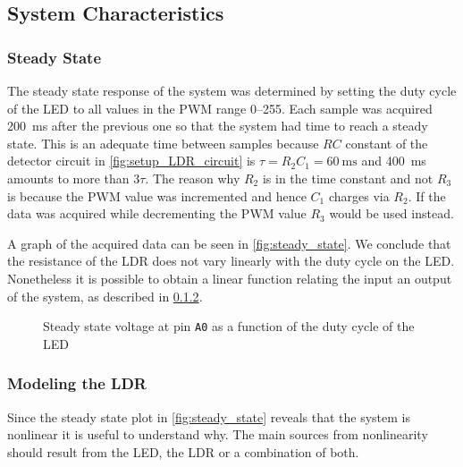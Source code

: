 \subsection{System Characteristics}
\label{sec:SystemCharacteristics}

\subsubsection{Steady State}
\label{sub:SteadyState}

The steady state response of the system was determined by setting the duty cycle of the LED to all values in the PWM range 0--255. Each sample was acquired \SI{200}{\milli\second} after the previous one so that the system had time to reach a steady state. This is an adequate time between samples because $RC$ constant of the detector circuit in \autoref{fig:setup_LDR_circuit} is $\tau = R_2C_1 = \SI{60}{\milli\second}$ and \SI{400}{\milli\second} amounts to more than $3\tau$. The reason why $R_2$ is in the time constant and not $R_3$ is because the PWM value was incremented and hence $C_1$ charges via $R_2$. If the data was acquired while decrementing the PWM value $R_3$ would be used instead.


A graph of the acquired data can be seen in \autoref{fig:steady_state}. We conclude that the resistance of the LDR does not vary linearly with the duty cycle on the LED. Nonetheless it is possible to obtain a linear function relating the input an output of the system, as described in \ref{subsubsec:LDR_model}.

\begin{figure}[h]
    \centering
    \resizebox{\textwidth}{!}{}
    \caption{Steady state voltage at pin \texttt{A0} as a function of the duty cycle of the LED}
    \label{fig:steady_state}
\end{figure}

\subsubsection{Modeling the LDR}
\label{subsubsec:LDR_model}

Since the steady state plot in \autoref{fig:steady_state} reveals that the system is nonlinear it is useful to understand why. The main sources from nonlinearity should result from the LED, the LDR or a combination of both.


